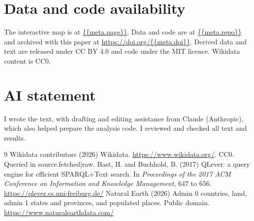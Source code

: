 \documentclass[11pt,a4paper]{article}
\begin{document}
\section*{Data and code availability}
The interactive map is at \url{{{meta.page}}}. Data and code are at \url{{{meta.repo}}} and archived with this paper at \url{https://doi.org/{{meta.doi}}}. Derived data and text are released under CC BY 4.0 and code under the MIT licence. Wikidata content is CC0.

\section*{AI statement}
I wrote the text, with drafting and editing assistance from Claude (Anthropic), which also helped prepare the analysis code. I reviewed and checked all text and results.

\begin{thebibliography}{9}
 Wikidata contributors (2026) Wikidata. \url{https://www.wikidata.org/}. CC0. Queried in {{source.fetched|raw}}.
 Bast, H. and Buchhold, B. (2017) QLever: a query engine for efficient SPARQL+Text search. In \textit{Proceedings of the 2017 ACM Conference on Information and Knowledge Management}, 647 to 656. \url{https://qlever.cs.uni-freiburg.de/}
 Natural Earth (2026) Admin 0 countries, land, admin 1 states and provinces, and populated places. Public domain. \url{https://www.naturalearthdata.com/}
\end{thebibliography}
\end{document}
